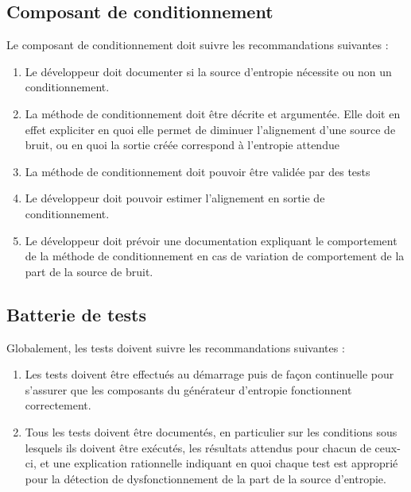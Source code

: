 \subsection{Composant de conditionnement}
Le composant de conditionnement doit suivre les recommandations suivantes :
\begin{enumerate}
\item Le développeur doit documenter si la source d'entropie nécessite ou non un conditionnement. 
\item La méthode de conditionnement doit être décrite et argumentée. Elle doit en effet expliciter en quoi elle permet de diminuer l'alignement d'une source de bruit, ou en quoi la sortie créée correspond à l'entropie attendue
\item La méthode de conditionnement doit pouvoir être validée par des tests
\item Le développeur doit pouvoir estimer l'alignement en sortie de conditionnement. 
\item Le développeur doit prévoir une documentation expliquant le comportement de la méthode de conditionnement en cas de variation de comportement de la part de la source de bruit.
\end{enumerate}

\subsection{Batterie de tests}
Globalement, les tests doivent suivre les recommandations suivantes :
\begin{enumerate}
\item Les tests doivent être effectués au démarrage puis de façon continuelle pour s'assurer que les composants du générateur d'entropie fonctionnent correctement.
\item Tous les tests doivent être documentés, en particulier sur les conditions sous lesquels ils doivent être exécutés, les résultats attendus pour chacun de ceux-ci, et une explication rationnelle indiquant en quoi chaque test est approprié pour la détection de dysfonctionnement de la part de la source d'entropie. 
\end{enumerate}

